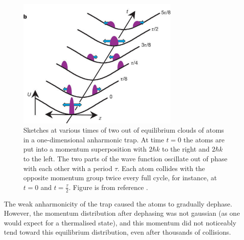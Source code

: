 \documentclass[a4paper, 10pt]{article}
\theoremstyle{plain}
\begin{document}
\begin{figure}[H]
    \begin{center}
    \includegraphics[width=8cm]{quantum_newtons_cradle}
    \end{center}
    \caption{Sketches at various times of two out of equilibrium clouds of atoms
             in a one-dimensional anharmonic trap. At time $t=0$ the atoms are
             put into a momentum superposition with $2\hbar k$ to the right and
             $2 \hbar k$ to the left. The two parts of the wave function
             oscillate out of phase with each other with a period $\tau$. Each
             atom collides with the opposite momentum group twice every full
             cycle, for instance, at $t=0$ and $t = \frac{\tau}{2}$. Figure is
             from reference \cite{Kinoshita2006}.}
 \end{figure}

The weak anharmonicity of the trap caused the atoms to gradually dephase.
However, the momentum distribution after dephasing was not gaussian (as one
would expect for a thermalised state), and this momentum did not noticeably
tend toward this equilibrium distribution, even after thousands of collisions.
\end{document}
